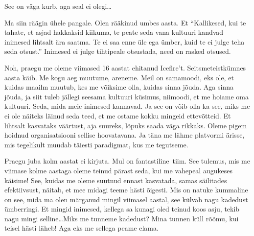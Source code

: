 See on väga kurb, aga seal ei olegi\ldots 

Ma siin räägin ühele pangale. Olen rääkinud umbes aasta. Et \enquote{Kallikesed, kui te tahate, et asjad hakkaksid kiikuma, te peate seda vana kultuuri kandvad inimesed lihtsalt ära saatma. Te ei saa enne üle ega ümber, kuid te ei julge teha seda otsust.} Inimesed ei julge tihtipeale otsustada, need on rasked otsused. 


Noh, praegu me oleme viimased 16 aastat ehitanud Icefire't. Seitsmeteistkümnes aasta käib. Me kogu aeg muutume, areneme. Meil on samamoodi, eks ole, et kuidas maailm muutub, kes me võiksime olla, kuidas sinna jõuda. Aga  sinna jõuda, ja siit tuleb jällegi seesama kultuuri küsimus, niimoodi, et  me hoiame oma kultuuri. Seda, mida meie inimesed kannavad. Ja see on võib-olla ka see, miks me ei ole näiteks läinud seda teed, et me ostame kokku mingeid  ettevõtteid. Et lihtsalt kasvataks väärtust, aja suureks, lõpuks saada väga rikkaks. Oleme pigem hoidnud organisatsiooni sellise hoovatavana. Ja täna me lähme platvormi ärisse, mis tegelikult muudab täiesti paradigmat, kus me tegutseme. 


Praegu juba kolm aastat ei kirjuta. Mul on fantastiline tiim. See tulemus, mis me viimase kolme aastaga oleme teinud pärast seda, kui me vahepeal augukeses käisime! See, kuidas me oleme suutnud ennast kasvatada, samas säilitades efektiivsust, näitab, et mee midagi teeme hästi õigesti. Mis on natuke kummaline on see, mida ma olen märganud mingil viimasel aastal, see külvab nagu kadedust ümberringi. Et mingid inimesed, kellega sa  kunagi oled teinud koos asju, tekib nagu mingi selline\ldots Miks me tunneme kadedust? Mina tunnen küll rõõmu, kui teisel hästi läheb! Aga eks me sellega peame  elama. 